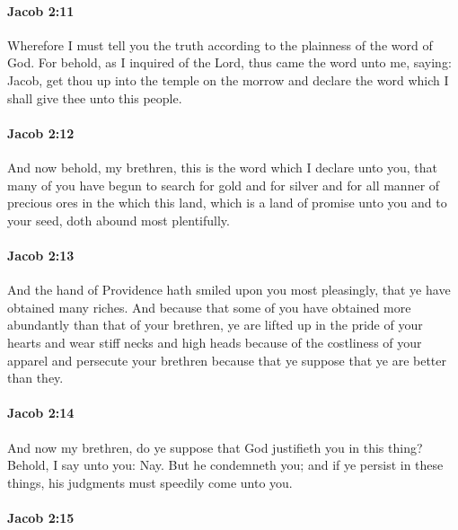 		\paragraph{Jacob 2:11} %
			\label{JACOB-2-11}

			Wherefore I must tell you the truth
			according to the plainness of the word of God.
			For behold, as I inquired of the Lord,
			thus came the word unto me, saying:
			Jacob, get thou up into the temple on the morrow
			and declare the word which I shall give thee
			unto this people.

		\paragraph{Jacob 2:12} %
			\label{JACOB-2-12}

			And now behold, my brethren, this is the word which I declare unto you,
			that many of you have begun to search for gold and for silver
			and for all manner of precious ores
			in the which this land,
			which is a land of promise unto you and to your seed,
			doth abound most plentifully.

		\paragraph{Jacob 2:13} %
			\label{JACOB-2-13}
			
			And the hand of Providence hath smiled upon you most pleasingly,
			that ye have obtained many riches.
			And because that some of you have obtained more abundantly
			than that of your brethren,
			ye are lifted up in the pride of your hearts and wear stiff necks and high heads
			because of the costliness of your apparel
			and persecute your brethren
			because that ye suppose that ye are better than they.
			
		\paragraph{Jacob 2:14} %
			\label{JACOB-2-14}

			And now my brethren, do ye suppose
			that God justifieth you in this thing?
			Behold, I say unto you: Nay.
			But he condemneth you;
			and if ye persist in these things,
			his judgments must speedily come unto you.

		\paragraph{Jacob 2:15} %
			\label{JACOB-2-15}

